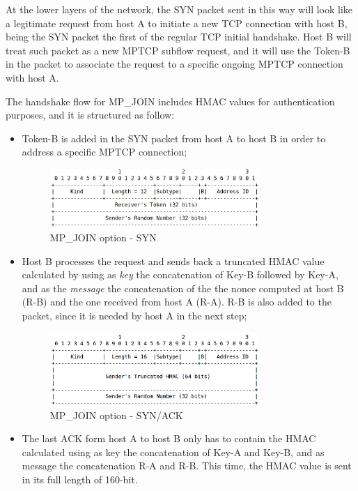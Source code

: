 At the lower layers of the network, the SYN packet sent in this way will look like a legitimate request from host A to initiate a new TCP connection with host B, being the SYN packet the first of the regular TCP initial handshake. Host B will treat such packet as a new MPTCP subflow request, and it will use the Token-B in the packet to associate the request to a specific ongoing MPTCP connection with host A.

The handshake flow for MP\_JOIN includes HMAC values for authentication purposes, and it is structured as follow:
\begin{itemize}
  \item Token-B is added in the SYN packet from host A to host B in order to address a specific MPTCP connection;
  \begin{figure}[!htb]
\centering
\includegraphics[width=0.75\textwidth]{images/opt_join1}
\caption{MP\_JOIN option - SYN}
\label{fig:opt_join1}
\end{figure}
  \item Host B processes the request and sends back a truncated HMAC value calculated by using as \textit{key} the concatenation of Key-B followed by Key-A, and as the \textit{message} the concatenation of the the nonce computed at host B (R-B) and the one received from host A (R-A). R-B is also added to the packet, since it is needed by host A in the next step;
\begin{figure}[!htb]
\centering
\includegraphics[width=0.75\textwidth]{images/opt_join2}
\caption{MP\_JOIN option - SYN/ACK}
\label{fig:opt_join2}
\end{figure}
  \item The last ACK form host A to host B only has to contain the HMAC calculated using as key the concatenation of Key-A and Key-B, and as message the concatenation R-A and R-B. This time, the HMAC value is sent in its full length of 160-bit.

\end{itemize}
